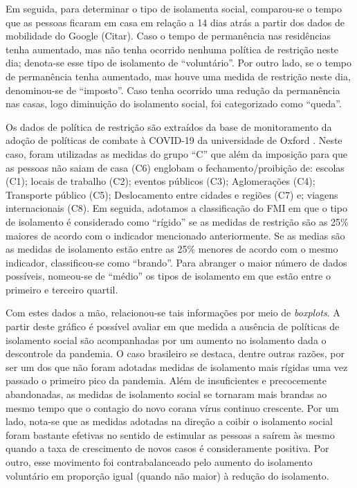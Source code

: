 \documentclass{SelfArx}
\begin{document}
Em seguida, para determinar o tipo de isolamenta social, comparou-se o tempo que as pessoas ficaram em casa em relação a 14 dias atrás a partir dos dados de mobilidade do Google (Citar).
Caso o tempo de permanência nas residências tenha aumentado, mas não tenha ocorrido nenhuma política de restrição neste dia; denota-se esse tipo de isolamento de ``voluntário''.
Por outro lado, se o tempo de permanência tenha aumentado, mas houve uma medida de restrição neste dia, denominou-se de ``imposto''.
Caso tenha ocorrido uma redução da permanência nas casas, logo diminuição do isolamento social, foi categorizado como ``queda''.

Os dados de política de restrição são extraídos da base de monitoramento da adoção de políticas de combate à COVID-19 da universidade de Oxford \cite{OxCGRT}.
Neste caso, foram utilizadas as medidas do grupo ``C'' que além da imposição para que as pessoas não saiam de casa (C6) englobam o fechamento/proibição de: escolas (C1); locais de trabalho (C2); eventos públicos (C3); Aglomerações (C4); Transporte público (C5); Deslocamento entre cidades e regiões (C7) e; viagens internacionais (C8).
Em seguida, adotamos a classificação do FMI em que o tipo de isolamento é considerado como ``rígido'' se as medidas de restrição são as 25\% maiores de acordo com o indicador mencionado anteriormente.
Se as medias são as medidas de isolamento estão entre as 25\% menores de acordo com o mesmo indicador, classificou-se como ``brando''.
Para abranger o maior número de dados possíveis, nomeou-se de ``médio'' os tipos de isolamento em que estão entre o primeiro e terceiro quartil.

Com estes dados a mão, relacionou-se tais informações por meio de \emph{boxplots}.
A partir deste gráfico é possível avaliar em que medida a ausência de políticas de isolamento social são acompanhadas por um aumento no isolamento dada o descontrole da pandemia.
O caso brasileiro se destaca, dentre outras razões, por ser um dos que não foram adotadas medidas de isolamento mais rígidas uma vez passado o primeiro pico da pandemia.
Além de insuficientes e precocemente abandonadas, as medidas de isolamento social se tornaram mais brandas ao mesmo tempo que o contagio do novo corana vírus continuo crescente.
Por um lado, nota-se que as medidas adotadas na direção a coibir o isolamento social foram bastante efetivas no sentido de estimular as pessoas a saírem às mesmo quando a taxa de crescimento de novos casos é consideramente positiva.
Por outro, esse movimento foi contrabalanceado pelo aumento do isolamento voluntário em proporção igual (quando não maior) à redução do isolamento.
\end{document}
